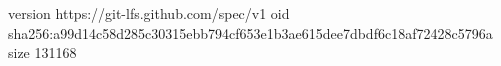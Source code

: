 version https://git-lfs.github.com/spec/v1
oid sha256:a99d14c58d285c30315ebb794cf653e1b3ae615dee7dbdf6c18af72428c5796a
size 131168
